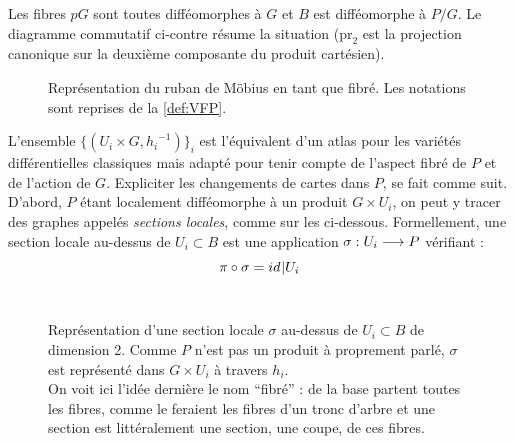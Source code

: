 \begin{definition}
\begin{adjustbox}{valign=C,raise=1cm, minipage={1.1\linewidth}}
		Les fibres $pG$ sont toutes difféomorphes à $G$ et $B$ est difféomorphe à $P/G$. Le diagramme commutatif ci-contre résume la situation ($\text{pr}_2$ est la projection canonique sur la deuxième composante du produit cartésien).
	\end{adjustbox}
\end{definition}
\skipl
\begin{figure}[h]
	
	\caption[\DONE Ruban de Möbius comme variété fibrée]{Représentation du ruban de Möbius en tant que fibré. Les notations sont reprises de la \cref{def:VFP}.}
	\label{fig:ruban2modius}
\end{figure}

L'ensemble $\big\{(U_i\times G, {h_i}^{-1})\big\}_i$ est l'équivalent d'un atlas pour les variétés différentielles classiques mais adapté pour tenir compte de l'aspect fibré de $P$ et de l'action de $G$. Expliciter les changements de cartes dans $P$, se fait comme suit.
\\
D'abord, $P$ étant localement difféomorphe à un produit $G\times U_i$, on peut y tracer des graphes appelés \emph{sections locales}, comme sur les  ci-dessous. Formellement, une section locale au-dessus  de $U_i \subset B$ est une application $\sigma : U_i \longrightarrow P$ vérifiant :
\[\pi\circ \sigma = id_{}{{\displaystyle |}U_i}\]
\\

\begin{figure}[h]
	
	\caption[\DONE Représentation d'une section local]
	{Représentation d'une section locale $\sigma$ au-dessus de $U_i\subset B$ de dimension 2. 
		Comme $P$ n'est pas un produit à proprement parlé, $\sigma$ est représenté dans $G\times U_i$ à travers $h_i$. \\
		On voit ici l'idée dernière le nom ``fibré'' : de la base partent toutes les fibres, comme le feraient les fibres d'un tronc d'arbre et une section est littéralement une section, une coupe, de ces fibres.}
	\label{fig:section_local}
\end{figure}
\skipl

